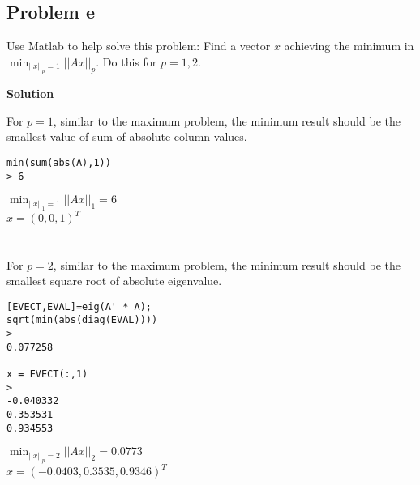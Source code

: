 \documentclass[12pt,oneside,a4paper]{article}
\newcommand{\subproblem}[1]
{
    \subsection*{Problem {#1}}
}
\newcommand{\solution}
{
    \vspace{15pt}
    \noindent\ignorespaces\textbf{\large Solution}
}
\begin{document}
\subproblem{e}
Use Matlab to help solve this problem: Find a vector $x$ achieving the minimum in $\min_{||x||_{p} = 1}||Ax||_{p}$. Do this for $p = 1, 2$.

\solution

For $p = 1$, similar to the maximum problem, the minimum result should be the smallest value of sum of absolute column values.
\begin{verbatim}
min(sum(abs(A),1))
> 6
\end{verbatim}
$\min_{||x||_{1} = 1}||Ax||_{1} = 6$\\
$x = (0, 0, 1)^{T}$
\\\\\\
For $p = 2$, similar to the maximum problem, the minimum result should be the smallest square root of absolute eigenvalue.
\begin{verbatim}
[EVECT,EVAL]=eig(A' * A);
sqrt(min(abs(diag(EVAL))))
> 
0.077258

x = EVECT(:,1)
>
-0.040332
0.353531
0.934553
\end{verbatim}
$\min_{||x||_{p} = 2}||Ax||_{2} = 0.0773$\\
$x = (-0.0403, 0.3535, 0.9346)^T$
\end{document}
